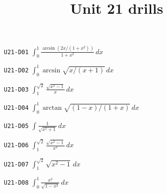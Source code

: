 \title{Unit 21 drills}\maketitle\begin{enumerate}
  \item[\texttt{U21-D01}] $\displaystyle \int_{0}^{1}\frac{\arcsin(2x/(1+x^{2}))}{1+x^{2}}\,dx$
  \item[\texttt{U21-D02}] $\displaystyle \int_{0}^{1}\arcsin\sqrt{x/(x+1)}\,dx$
  \item[\texttt{U21-D03}] $\displaystyle \int_{1}^{\sqrt{2}}\frac{\sqrt{x^{2}-1}}{x}\,dx$
  \item[\texttt{U21-D04}] $\displaystyle \int_{0}^{1}\arctan\sqrt{(1-x)/(1+x)}\,dx$
  \item[\texttt{U21-D05}] $\displaystyle \int\frac{1}{\sqrt{x^{2}+1}}\,dx$
  \item[\texttt{U21-D06}] $\displaystyle \int_{1}^{\sqrt{2}}\frac{\sqrt{x^{2}-1}}{x^{2}}\,dx$
  \item[\texttt{U21-D07}] $\displaystyle \int_{1}^{\sqrt{2}}\sqrt{x^{2}-1}\,dx$
  \item[\texttt{U21-D08}] $\displaystyle \int_{0}^{1}\frac{x^{2}}{\sqrt{1-x^{2}}}\,dx$
\end{enumerate}

